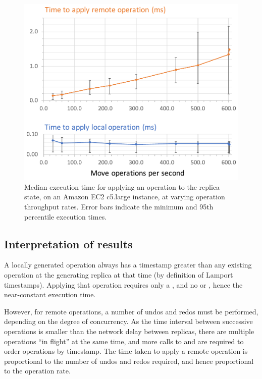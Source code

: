 \documentclass[sigplan,anonymous]{acmart}
\begin{document}
\begin{figure}
  \includegraphics[width=\columnwidth,keepaspectratio=true]{plot.pdf}
  \caption{Median execution time for applying an operation to the replica state, on an Amazon EC2 c5.large instance, at varying operation throughput rates. Error bars indicate the minimum and 95th percentile execution times.}
  \label{fig:plots}
\end{figure}

\subsection{Interpretation of results}

A locally generated operation always has a timestamp greater than any existing operation at the generating replica at that time (by definition of Lamport timestamps).
Applying that operation requires only a , and no  or , hence the near-constant execution time.

However, for remote operations, a number of undos and redos must be performed, depending on the degree of concurrency.
As the time interval between successive operations is smaller than the network delay between replicas, there are multiple operations ``in flight'' at the same time, and more calls to  and  are required to order operations by timestamp.
The time taken to apply a remote operation is proportional to the number of undos and redos required, and hence proportional to the operation rate.
\end{document}
